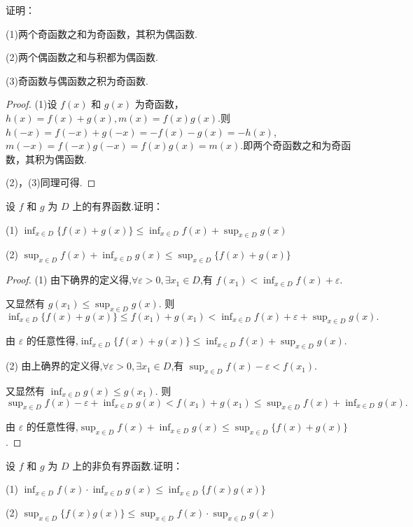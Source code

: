 \begin{practice}
    证明：

    (1)两个奇函数之和为奇函数，其积为偶函数.

    (2)两个偶函数之和与积都为偶函数.

    (3)奇函数与偶函数之积为奇函数.
\end{practice}

\begin{proof}
    (1)设 $f(x)$ 和 $g(x)$ 为奇函数，$h(x)=f(x)+g(x),m(x)=f(x)g(x)$.则 $h(-x)=f(-x)+g(-x)=-f(x)-g(x)=-h(x)$,$m(-x)=f(-x)g(-x)=f(x)g(x)=m(x)$.即两个奇函数之和为奇函数，其积为偶函数.

    (2)，(3)同理可得.
\end{proof}

\begin{practice}
    设  $f$ 和 $g$  为 $D$ 上的有界函数.证明：

    (1) $\inf_{x\in D} \{f(x)+g(x)\} \le \inf_{x\in D} f(x)+\sup_{x\in D} g(x)$

    (2) $\sup_{x\in D} f(x)+\inf_{x\in D} g(x) \le \sup_{x\in D} \{f(x)+g(x)\}$
\end{practice}

\begin{proof}
    (1) 由下确界的定义得,$\forall \varepsilon>0,\exists x_1\in D$,有 $f(x_1)<\inf_{x\in D} f(x)+ \varepsilon$.
    
    又显然有 $g(x_1)\le \sup_{x\in D} g(x)$. 则 $\inf_{x\in D} \{f(x)+g(x)\} \le f(x_1)+g(x_1) < \inf_{x\in D} f(x)+ \varepsilon + \sup_{x\in D} g(x).$

    由 $\varepsilon$ 的任意性得,$\inf_{x\in D} \{f(x)+g(x)\} \le \inf_{x\in D} f(x)+\sup_{x\in D} g(x)$.

    (2) 由上确界的定义得,$\forall \varepsilon>0,\exists x_1\in D$,有 $\sup_{x\in D} f(x) - \varepsilon < f(x_1)$.
    
    又显然有 $\inf_{x\in D} g(x) \le g(x_1)$. 则 $\sup_{x\in D} f(x)- \varepsilon + \inf_{x\in D} g(x) < f(x_1)  + g(x_1) \le \sup_{x\in D} f(x) + \inf_{x\in D} g(x).$

    由 $\varepsilon$ 的任意性得,$\sup_{x\in D} f(x)+\inf_{x\in D} g(x) \le \sup_{x\in D} \{f(x)+g(x)\}$.
\end{proof}

\begin{practice}
    设  $f$ 和 $g$  为 $D$ 上的非负有界函数.证明：

    (1) $\inf_{x\in D} f(x) \cdot \inf_{x\in D} g(x) \le \inf_{x\in D} \{f(x)g(x)\}$

    (2) $\sup_{x\in D} \{f(x)g(x)\} \le \sup_{x\in D} f(x) \cdot \sup_{x\in D} g(x)$
\end{practice}

